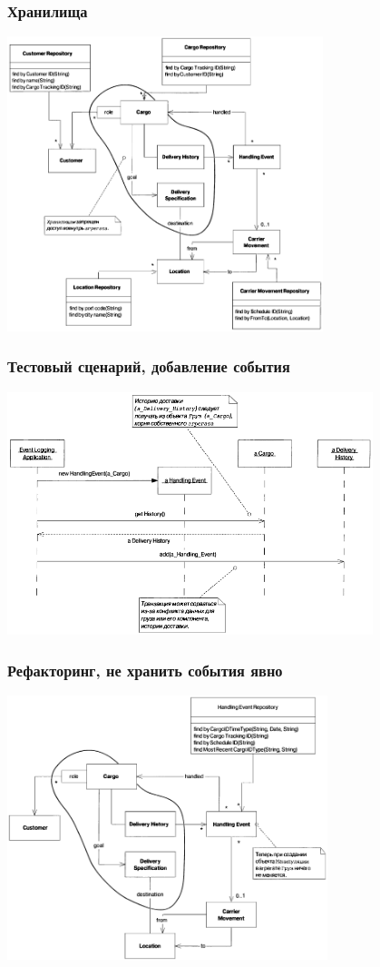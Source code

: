 \documentclass[xetex,mathserif,serif]{beamer}
\begin{document}
	\begin{frame}
		\frametitle{Хранилища}
		\begin{center}
			\includegraphics[width=0.69\textwidth]{cargoRepositories.png}
		\end{center}
	\end{frame}

	\begin{frame}
		\frametitle{Тестовый сценарий, добавление события}
		\begin{center}
			\includegraphics[width=0.8\textwidth]{cargoAddEvent.png}
		\end{center}
	\end{frame}

	\begin{frame}
		\frametitle{Рефакторинг, не хранить события явно}
		\begin{center}
			\includegraphics[width=0.7\textwidth]{cargoRefactored.png}
		\end{center}
	\end{frame}
\end{document}

